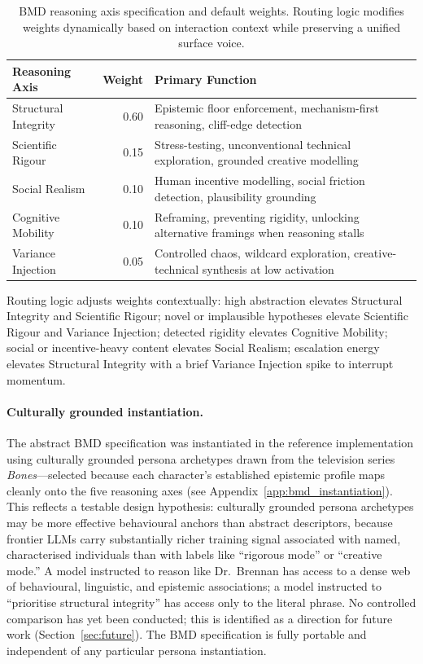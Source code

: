 \documentclass[11pt,a4paper]{article}
\begin{document}
\begin{table}[t]
\centering
\caption{BMD reasoning axis specification and default weights. Routing logic modifies weights dynamically based on interaction context while preserving a unified surface voice.}
\label{tab:bmd}
\small
\begin{tabularx}{\textwidth}{lrX}
\toprule
\textbf{Reasoning Axis} & \textbf{Weight} & \textbf{Primary Function} \\
\midrule
Structural Integrity & 0.60 & Epistemic floor enforcement, mechanism-first reasoning, cliff-edge detection \\
Scientific Rigour & 0.15 & Stress-testing, unconventional technical exploration, grounded creative modelling \\
Social Realism & 0.10 & Human incentive modelling, social friction detection, plausibility grounding \\
Cognitive Mobility & 0.10 & Reframing, preventing rigidity, unlocking alternative framings when reasoning stalls \\
Variance Injection & 0.05 & Controlled chaos, wildcard exploration, creative-technical synthesis at low activation \\
\bottomrule
\end{tabularx}
\end{table}

Routing logic adjusts weights contextually: high abstraction elevates Structural Integrity and Scientific Rigour; novel or implausible hypotheses elevate Scientific Rigour and Variance Injection; detected rigidity elevates Cognitive Mobility; social or incentive-heavy content elevates Social Realism; escalation energy elevates Structural Integrity with a brief Variance Injection spike to interrupt momentum.

\paragraph{Culturally grounded instantiation.}
The abstract BMD specification was instantiated in the reference implementation using culturally grounded persona archetypes drawn from the television series \emph{Bones}---selected because each character's established epistemic profile maps cleanly onto the five reasoning axes (see Appendix~\ref{app:bmd_instantiation}).
This reflects a testable design hypothesis: culturally grounded persona archetypes may be more effective behavioural anchors than abstract descriptors, because frontier LLMs carry substantially richer training signal associated with named, characterised individuals than with labels like ``rigorous mode'' or ``creative mode.''
A model instructed to reason like Dr.\ Brennan has access to a dense web of behavioural, linguistic, and epistemic associations; a model instructed to ``prioritise structural integrity'' has access only to the literal phrase.
No controlled comparison has yet been conducted; this is identified as a direction for future work (Section~\ref{sec:future}).
The BMD specification is fully portable and independent of any particular persona instantiation.
\end{document}
